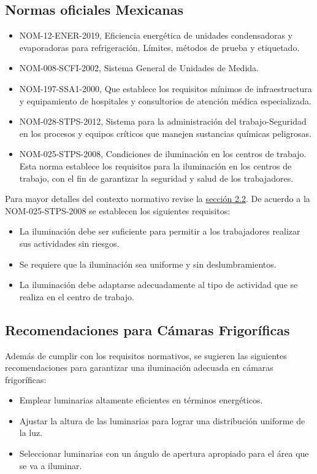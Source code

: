 \subsection{Normas oficiales Mexicanas}
\begin{itemize}
	\item NOM-12-ENER-2019, Eficiencia energética de unidades condensadoras y evaporadoras para refrigeración. Límites, métodos de prueba y etiquetado.
	\item NOM-008-SCFI-2002, Sistema General de Unidades de Medida.
	\item NOM-197-SSA1-2000, Que establece los requisitos mínimos de infraestructura y equipamiento de hospitales y consultorios de atención médica especializada.
	\item NOM-028-STPS-2012, Sistema para la administración del trabajo-Seguridad en los procesos y equipos críticos que manejen sustancias químicas peligrosas.
	\item NOM-025-STPS-2008, Condiciones de iluminación en los
	centros de trabajo. Esta norma establece los requisitos para la iluminación en los
	centros de trabajo, con el fin de garantizar la seguridad y salud de los trabajadores.
\end{itemize}
Para mayor detalles del contexto normativo revise la \hyperref[sec:contexto-normativo]{sección 2.2}.
De acuerdo a la NOM-025-STPS-2008 se establecen los siguientes requisitos:


\begin{itemize}
	\item La iluminación debe ser suficiente para permitir a los trabajadores realizar sus actividades sin riesgos.
	\item Se requiere que la iluminación sea uniforme y sin deslumbramientos.
	\item La iluminación debe adaptarse adecuadamente al tipo de actividad que se realiza en el centro de trabajo.
\end{itemize}

\subsection{Recomendaciones para Cámaras Frigoríficas}

Además de cumplir con los requisitos normativos, se sugieren las siguientes recomendaciones para garantizar una iluminación adecuada en cámaras frigoríficas:

\begin{itemize}
	\item Emplear luminarias altamente eficientes en términos energéticos.
	\item Ajustar la altura de las luminarias para lograr una distribución uniforme de la luz.
	\item Seleccionar luminarias con un ángulo de apertura apropiado para el área que se va a iluminar.
\end{itemize}


